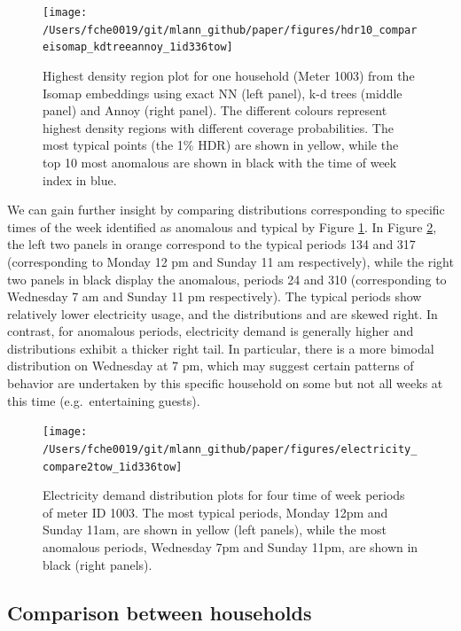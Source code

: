 \documentclass[12pt]{article}
\begin{document}
\begin{figure}

{\centering \texttt{[image: /Users/fche0019/git/mlann\_github/paper/figures/hdr10\_compareisomap\_kdtreeannoy\_1id336tow]} 

}

\caption{Highest density region plot for one household (Meter 1003) from the Isomap embeddings using exact NN (left panel), k-d trees (middle panel) and Annoy (right panel). The different colours represent highest density regions with different coverage probabilities. The most typical points (the 1\% HDR) are shown in yellow, while the top 10 most anomalous are shown in black with the time of week index in blue.}\label{fig:anomalies1id}
\end{figure}

We can gain further insight by comparing distributions corresponding to specific times of the week identified as anomalous and typical by Figure \ref{fig:anomalies1id}. In Figure \ref{fig:compare2tow}, the left two panels in orange correspond to the typical periods 134 and 317 (corresponding to Monday 12 pm and Sunday 11 am respectively), while the right two panels in black display the anomalous, periods 24 and 310 (corresponding to Wednesday 7 am and Sunday 11 pm respectively). The typical periods show relatively lower electricity usage, and the distributions and are skewed right. In contrast, for anomalous periods, electricity demand is generally higher and distributions exhibit a thicker right tail. In particular, there is a more bimodal distribution on Wednesday at 7 pm, which may suggest certain patterns of behavior are undertaken by this specific household on some but not all weeks at this time (e.g.~entertaining guests).

\begin{figure}

{\centering \texttt{[image: /Users/fche0019/git/mlann\_github/paper/figures/electricity\_compare2tow\_1id336tow]} 

}

\caption{Electricity demand distribution plots for four time of week periods of meter ID 1003. The most typical periods, Monday 12pm and Sunday 11am, are shown in yellow (left panels), while the most anomalous periods, Wednesday 7pm and Sunday 11pm, are shown in black (right panels). }\label{fig:compare2tow}
\end{figure}

\hypertarget{comparison-between-households}{%
\subsection{Comparison between households}\label{comparison-between-households}}
\end{document}
